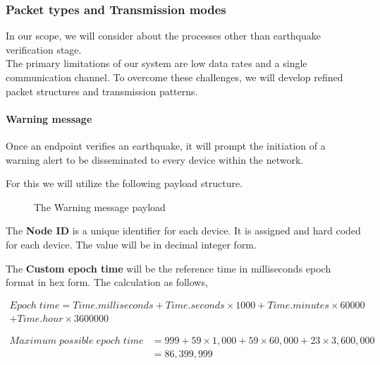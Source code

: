 \subsubsection{Packet types and Transmission modes}
In our scope, we will consider about the processes other than earthquake verification stage.\\

The primary limitations of our system are low data rates and a single communication channel. To overcome these challenges, we will develop refined packet structures and transmission patterns.


\paragraph {Warning message}\label{par:Warn}
Once an endpoint verifies an earthquake, it will prompt the initiation of a warning alert to be disseminated to every device within the network.

For this we will utilize the following payload structure.

\begin{figure}[ht!]
    \centering
    
    \caption{The Warning message payload}
    \label{fig:intrpt}
\end{figure}

The \textbf{Node ID} is a unique identifier for each device. It is assigned and hard coded for each device. The value will be in decimal integer form.

The \textbf{Custom epoch time} will be the reference time in milliseconds epoch format in hex form. The calculation as follows,

\begin{equation}
\begin{aligned}
Epoch\;time = Time.milliseconds + Time.seconds \times 1000 + Time.minutes \times 60000 \\ + Time.hour \times 3600000
\end{aligned}
\end{equation}


\begin{equation}
\begin{aligned}
Maximum \; possible \;epoch \;time &=  999 + 59 \times 1,000 + 59 \times  60,000 + 23 \times  3,600,000\\
&= 86,399,999
\end{aligned}
\end{equation}


